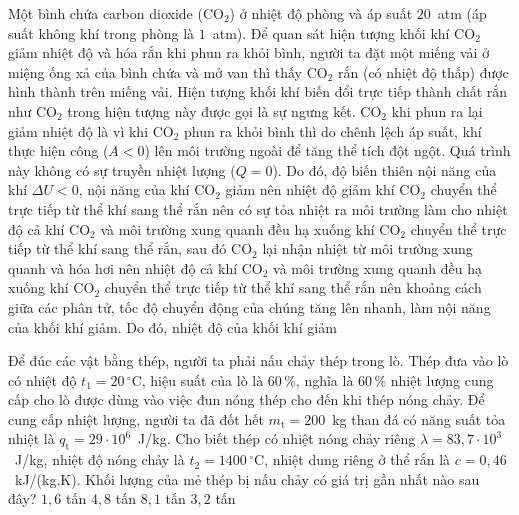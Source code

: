 	\begin{ex}%
		Một bình chứa carbon dioxide (CO$_2$) ở nhiệt độ phòng và áp suất $20$~atm (áp suất không khí trong phòng là $1$~atm). Để quan sát hiện tượng khối khí CO$_2$ giảm nhiệt độ và hóa rắn khi phun ra khỏi bình, người ta đặt một miếng vải ở miệng ống xả của bình chứa và mở van thì thấy CO$_2$ rắn (có nhiệt độ thấp) được hình thành trên miếng vải. Hiện tượng khối khí biến đổi trực tiếp thành chất rắn như CO$_2$ trong hiện tượng này được gọi là sự ngưng kết. CO$_2$ khi phun ra lại giảm nhiệt độ là vì
		\choice
		{\True khi CO$_2$ phun ra khỏi bình thì do chênh lệch áp suất, khí thực hiện công ($A<0$) lên môi trường ngoài để tăng thể tích đột ngột. Quá trình này không có sự truyền nhiệt lượng ($Q=0$). Do đó, độ biến thiên nội năng của khí $\Delta U<0$, nội năng của khí CO$_2$ giảm nên nhiệt độ giảm}
		{khí CO$_2$ chuyển thể trực tiếp từ thể khí sang thể rắn nên có sự tỏa nhiệt ra môi trường làm cho nhiệt độ cả khí CO$_2$ và môi trường xung quanh đều hạ xuống}
		{khí CO$_2$ chuyển thể trực tiếp từ thể khí sang thể rắn, sau đó CO$_2$ lại nhận nhiệt từ môi trường xung quanh và hóa hơi nên nhiệt độ cả khí CO$_2$ và môi trường xung quanh đều hạ xuống}
		{khí CO$_2$ chuyển thể trực tiếp từ thể khí sang thể rắn nên khoảng cách giữa các phân tử, tốc độ chuyển động của chúng tăng lên nhanh, làm nội năng của khối khí giảm. Do đó, nhiệt độ của khối khí giảm}
	\end{ex}

	\begin{ex}%
		Để đúc các vật bằng thép, người ta phải nấu chảy thép trong lò. Thép đưa vào lò có nhiệt độ $t_1=20\,^\circ\text{C}$, hiệu suất của lò là $60\,\%$, nghĩa là $60\,\%$ nhiệt lượng cung cấp cho lò được dùng vào việc đun nóng thép cho đến khi thép nóng chảy. Để cung cấp nhiệt lượng, người ta đã đốt hết $m_\text{t}=200$~kg than đá có năng suất tỏa nhiệt là $q_\text{t}=29\cdot 10^6$~J/kg. Cho biết thép có nhiệt nóng chảy riêng $\lambda=83{,}7\cdot 10^3$~J/kg, nhiệt độ nóng chảy là $t_2=1400\,^\circ\text{C}$, nhiệt dung riêng ở thể rắn là $c=0{,}46$~kJ/(kg.K). Khối lượng của mẻ thép bị nấu chảy có giá trị gần nhất nào sau đây?
		\choice
		{$1{,}6$ tấn}
		{\True $4{,}8$ tấn}
		{$8{,}1$ tấn}
		{$3{,}2$ tấn}
	\end{ex}

